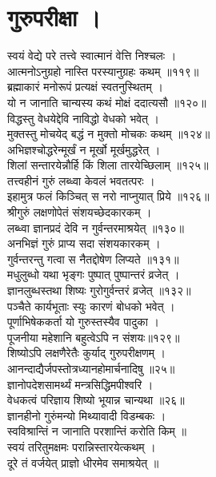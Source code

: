 \section{गुरुपरीक्षा ।}

स्वयं वेद्ये परे तत्त्वे स्वात्मानं वेत्ति निश्चलः ।\\[-2mm]
आत्मनोऽनुग्रहो नास्ति परस्यानुग्रहः कथम् ॥११९॥\\
ब्रह्माकारं मनोरूपं प्रत्यक्षं स्वतनुस्थितम् ।\\[-2mm]
यो न जानाति चान्यस्य कथं मोक्षं ददात्यसौ ॥१२०॥\\
विद्धस्तु वेधयेद्देवि नाविद्धो वेधको भवेत् ।\\[-2mm]
मुक्तस्तु मोचयेद् बद्धं न मुक्तो मोचकः कथम् ॥१२४॥\\
अभिज्ञश्चोद्धरेन्मूर्खं न मूर्खो मूर्खमुद्धरेत् ।\\[-2mm]
शिलां सन्तारयेन्नौर्हि किं शिला तारयेच्छिलाम् ॥१२५॥\\
तत्त्वहीनं गुरुं लब्ध्वा केवलं भवतत्परः ।\\[-2mm]
इहामुत्र फलं किञ्चित् स नरो नाप्नुयात् प्रिये ॥१२६॥\\
श्रीगुरुं लक्षणोपेतं संशयच्छेदकारकम् ।\\[-2mm]
लब्ध्वा ज्ञानप्रदं देवि न गुर्वन्तरमाश्रयेत् ॥१३०॥\\
अनभिज्ञं गुरुं प्राप्य सदा संशयकारकम् ।\\[-2mm]
गुर्वन्तरन्तु गत्वा स नैतद्दोषेण लिप्यते ॥१३१॥\\
मधुलुब्धो यथा भृङ्गः पुष्पात् पुष्पान्तरं व्रजेत् ।\\[-2mm]
ज्ञानलुब्धस्तथा शिष्यः गुरोगुर्वन्तरं व्रजेत् ॥१३२॥\\
पञ्चैते कार्यभूताः स्युः कारणं बोधको भवेत् ।\\[-2mm]
पूर्णाभिषेककर्ता यो गुरुस्तस्यैव पादुका ।\\[-2mm]
पूजनीया महेशानि बहुत्वेऽपि न संशयः॥१२९॥\\
शिष्योऽपि लक्षणैरेतैः कुर्याद् गुरुपरीक्षणम् ।\\[-2mm]
आनन्दाद्यैर्जपस्तोत्रध्यानहोमार्चनादिषु ॥२५॥\\
ज्ञानोपदेशसामर्थ्यं मन्त्रसिद्धिमपीश्वरि ।\\[-2mm]
वेधकत्वं परिज्ञाय शिष्यो भूयान्न चान्यथा ॥२६॥\\
ज्ञानहीनो गुरुंमन्यो मिथ्यावादी विडम्बकः ।\\[-2mm]
स्वविश्रान्तिं न जानाति परशान्तिं करोति किम् ॥\\
स्वयं तरितुमक्षमः परान्निस्तारयेत्कथम् ।\\[-2mm]
दूरे तं वर्जयेत् प्राज्ञो धीरमेव समाश्रयेत् ॥	

